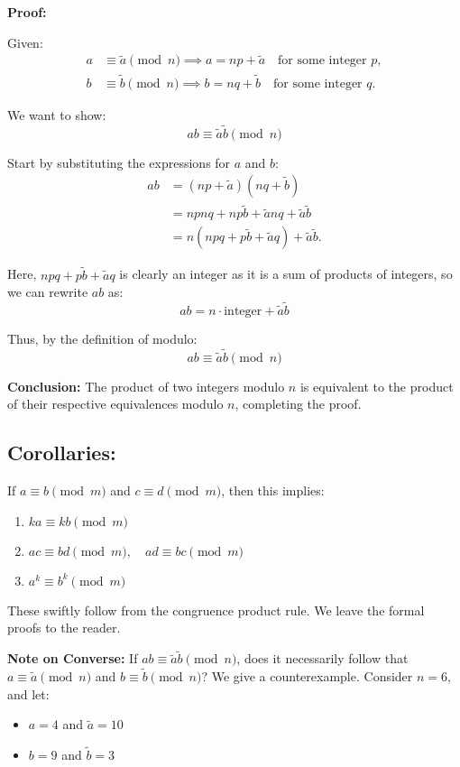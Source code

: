 \documentclass{article}
\begin{document}
\textbf{Proof:}

Given:
\begin{align*}
a &\equiv \tilde{a} \pmod{n} \implies a = np + \tilde{a} \quad \text{for some integer } p, \\
b &\equiv \tilde{b} \pmod{n} \implies b = nq + \tilde{b} \quad \text{for some integer } q.
\end{align*}

We want to show:
\[
ab \equiv \tilde{a}\tilde{b} \pmod{n}
\]

Start by substituting the expressions for \( a \) and \( b \):
\begin{align*}
ab &= (np + \tilde{a})(nq + \tilde{b}) \\
   &= npnq + np\tilde{b} + \tilde{a}nq + \tilde{a}\tilde{b} \\
   &= n(npq + p\tilde{b} + \tilde{a}q) + \tilde{a}\tilde{b}.
\end{align*}

Here, \( npq + p\tilde{b} + \tilde{a}q \) is clearly an integer as it is a sum of products of integers, so we can rewrite \( ab \) as:
\[
ab = n\cdot \text{integer} + \tilde{a}\tilde{b}
\]

Thus, by the definition of modulo:
\[
ab \equiv \tilde{a}\tilde{b} \pmod{n}
\]

\textbf{Conclusion:} The product of two integers modulo \( n \) is equivalent to the product of their respective equivalences modulo \( n \), completing the proof.

\subsection*{Corollaries: } If \( a \equiv b \pmod{m} \) and \( c \equiv d \pmod{m} \), then this implies:
\begin{enumerate}
    \item \( ka \equiv kb \pmod{m} \)
    \item \( ac \equiv bd \pmod{m}, \quad ad \equiv bc \pmod{m} \)
    \item \( a^k \equiv b^k \pmod{m} \)
\end{enumerate}
These swiftly follow from the congruence product rule. We leave the formal proofs to the reader. 


\textbf{Note on Converse:} If \( ab \equiv \tilde{a}\tilde{b} \pmod{n} \), does it necessarily follow that \( a \equiv \tilde{a} \pmod{n} \) and \( b \equiv \tilde{b} \pmod{n} \)?
We give a counterexample. Consider \( n = 6 \), and let:
\begin{itemize}
    \item \( a = 4 \) and \( \tilde{a} = 10 \)
    \item \( b = 9 \) and \( \tilde{b} = 3 \)
\end{itemize}
\end{document}
